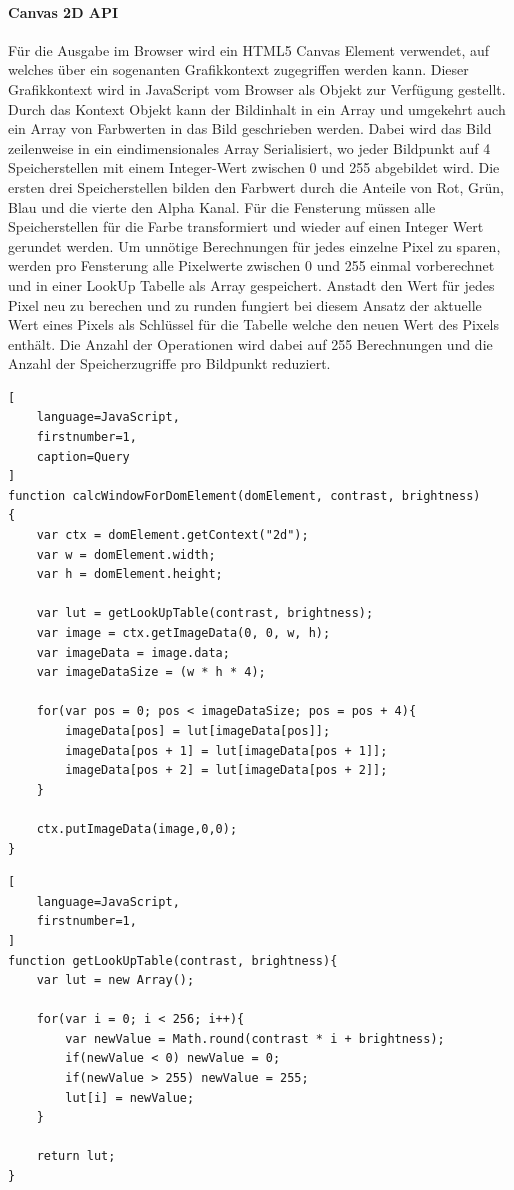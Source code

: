 \paragraph{Canvas 2D API}
Für die Ausgabe im Browser wird ein HTML5 Canvas Element verwendet,
auf welches über ein sogenanten Grafikkontext zugegriffen werden kann. 
Dieser Grafikkontext wird in JavaScript vom Browser als Objekt zur Verfügung gestellt.
Durch das Kontext Objekt kann der Bildinhalt in ein Array und umgekehrt auch ein Array von Farbwerten in das Bild geschrieben werden.
Dabei wird das Bild zeilenweise in ein eindimensionales Array Serialisiert, 
wo jeder Bildpunkt auf 4 Speicherstellen mit einem Integer-Wert zwischen 0 und 255 abgebildet wird.
Die ersten drei Speicherstellen bilden den Farbwert durch die Anteile von Rot, Grün, Blau und die vierte den Alpha Kanal.
Für die Fensterung müssen alle Speicherstellen für die Farbe transformiert und wieder auf einen Integer Wert gerundet werden.
%
Um unnötige Berechnungen für jedes einzelne Pixel zu sparen, werden pro Fensterung alle Pixelwerte zwischen 0 und 255 einmal vorberechnet und in einer LookUp Tabelle als Array gespeichert.
Anstadt den Wert für jedes Pixel neu zu berechen und zu runden fungiert bei diesem Ansatz der aktuelle Wert eines Pixels als Schlüssel für die Tabelle welche den neuen Wert des Pixels enthält.
Die Anzahl der Operationen wird dabei auf 255 Berechnungen und die Anzahl der Speicherzugriffe pro Bildpunkt reduziert.
\begin{lstlisting}[
	language=JavaScript,
	firstnumber=1,
	caption=Query
]
function calcWindowForDomElement(domElement, contrast, brightness)
{
    var ctx = domElement.getContext("2d");
    var w = domElement.width;
    var h = domElement.height;

    var lut = getLookUpTable(contrast, brightness);
    var image = ctx.getImageData(0, 0, w, h);
    var imageData = image.data;
    var imageDataSize = (w * h * 4);

    for(var pos = 0; pos < imageDataSize; pos = pos + 4){
        imageData[pos] = lut[imageData[pos]];
        imageData[pos + 1] = lut[imageData[pos + 1]];
        imageData[pos + 2] = lut[imageData[pos + 2]];
    }

    ctx.putImageData(image,0,0);
}
\end{lstlisting}
\begin{lstlisting}[
	language=JavaScript,
	firstnumber=1,
]
function getLookUpTable(contrast, brightness){
    var lut = new Array();

    for(var i = 0; i < 256; i++){
        var newValue = Math.round(contrast * i + brightness);
        if(newValue < 0) newValue = 0;
        if(newValue > 255) newValue = 255;
        lut[i] = newValue;
    }

    return lut;
}
\end{lstlisting}



